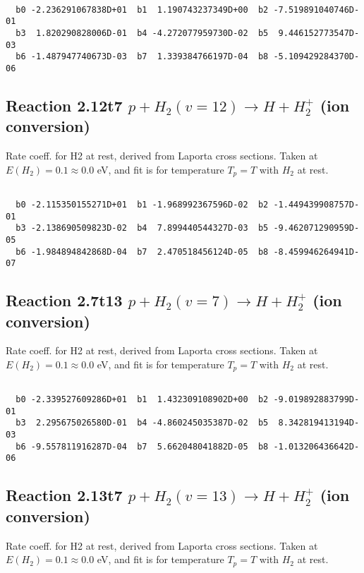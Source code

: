 \begin{small}\begin{verbatim}

  b0 -2.236291067838D+01  b1  1.190743237349D+00  b2 -7.519891040746D-01
  b3  1.820290828006D-01  b4 -4.272077959730D-02  b5  9.446152773547D-03
  b6 -1.487947740673D-03  b7  1.339384766197D-04  b8 -5.109429284370D-06

\end{verbatim}\end{small}

\newpage
\subsection{
Reaction 2.12t7
$ p + H_2(v=12) \rightarrow H + H_2^+$ (ion conversion)
}
Rate coeff. for H2 at rest, derived from Laporta cross sections.
Taken at $E(H_2) = 0.1 \approx 0.0$ eV,  and fit is for temperature $T_p=T$ with $H_2$ at rest.

\begin{small}\begin{verbatim}

  b0 -2.115350155271D+01  b1 -1.968992367596D-02  b2 -1.449439908757D-01
  b3 -2.138690509823D-02  b4  7.899440544327D-03  b5 -9.462071290959D-05
  b6 -1.984894842868D-04  b7  2.470518456124D-05  b8 -8.459946264941D-07

\end{verbatim}\end{small}

\newpage
\subsection{
Reaction 2.7t13
$ p + H_2(v=7) \rightarrow H + H_2^+$ (ion conversion)
}
Rate coeff. for H2 at rest, derived from Laporta cross sections.
Taken at $E(H_2) = 0.1 \approx 0.0$ eV,  and fit is for temperature $T_p=T$ with $H_2$ at rest.

\begin{small}\begin{verbatim}

  b0 -2.339527609286D+01  b1  1.432309108902D+00  b2 -9.019892883799D-01
  b3  2.295675026580D-01  b4 -4.860245035387D-02  b5  8.342819413194D-03
  b6 -9.557811916287D-04  b7  5.662048041882D-05  b8 -1.013206436642D-06

\end{verbatim}\end{small}

\newpage
\subsection{
Reaction 2.13t7
$ p + H_2(v=13) \rightarrow H + H_2^+$ (ion conversion)
}
Rate coeff. for H2 at rest, derived from Laporta cross sections.
Taken at $E(H_2) = 0.1 \approx 0.0$ eV,  and fit is for temperature $T_p=T$ with $H_2$ at rest.

